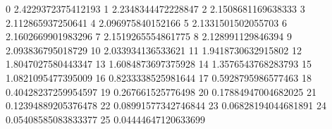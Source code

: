 0 2.4229372375412193
1 2.2348344472228847
2 2.1508681169638333
3 2.112865937250641
4 2.096975840152166
5 2.1331501502055703
6 2.1602669901983296
7 2.1519265554861775
8 2.128991129846394
9 2.093836795018729
10 2.033934136533621
11 1.9418730632915802
12 1.8047027580443347
13 1.6084873697375928
14 1.3576543768283793
15 1.0821095477395009
16 0.8233338525981644
17 0.5928795986577463
18 0.40428237259954597
19 0.267661525776498
20 0.17884947004682025
21 0.12394889205376478
22 0.08991577342746844
23 0.06828194044681891
24 0.05408585083833377
25 0.04444647120633699
